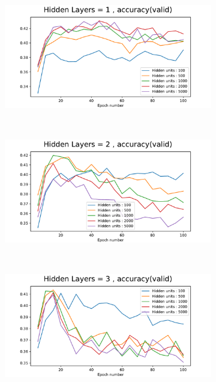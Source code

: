 \documentclass[12pt]{article}
\begin{document}
\begin{figure}[ht!]
    \centering
    \begin{subfigure}[t]{0.475\textwidth}
        \centering
        \includegraphics[width=1.0\linewidth]{hidden_units_layers_2_accuracy(valid).pdf}
    \end{subfigure}%
    ~ 
    \begin{subfigure}[t]{0.475\textwidth}
        \centering
        \includegraphics[width=1.0\linewidth]{hidden_units_layers_3_accuracy(valid).pdf}
    \end{subfigure}
    ~
    \begin{subfigure}[t]{0.475\textwidth}
        \centering
        \includegraphics[width=1.0\linewidth]{hidden_units_layers_4_accuracy(valid).pdf}

\end{subfigure}
\end{figure}
\end{document}

